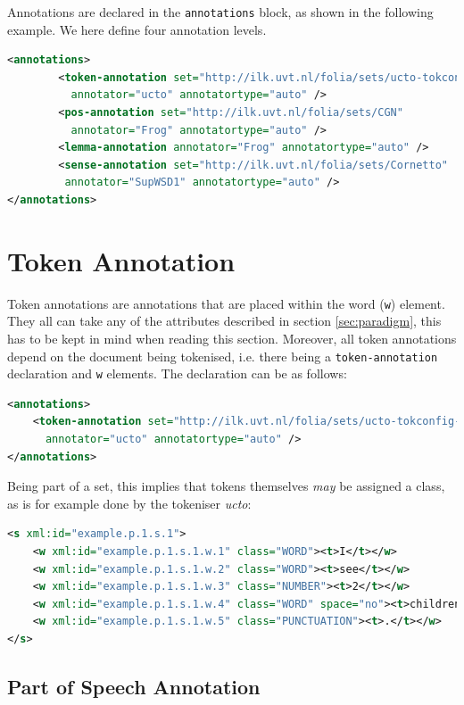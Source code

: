 \documentclass[a4paper,12pt]{report}
\begin{document}
Annotations are declared in the \texttt{annotations} block, as shown in the following example. We here define four annotation levels.

\begin{lstlisting}[language=xml]
<annotations>
        <token-annotation set="http://ilk.uvt.nl/folia/sets/ucto-tokconfig-nl" 
          annotator="ucto" annotatortype="auto" />
        <pos-annotation set="http://ilk.uvt.nl/folia/sets/CGN" 
          annotator="Frog" annotatortype="auto" />
        <lemma-annotation annotator="Frog" annotatortype="auto" />    
        <sense-annotation set="http://ilk.uvt.nl/folia/sets/Cornetto"
         annotator="SupWSD1" annotatortype="auto" />    
</annotations>
\end{lstlisting}


\section{Token Annotation}

Token annotations are annotations that are placed within the word (\texttt{w}) element. They all can take any of the attributes described in section \ref{sec:paradigm}, this has to be kept in mind when reading this section. Moreover, all token annotations depend on the document being tokenised, i.e. there being a \texttt{token-annotation} declaration and \texttt{w} elements. The declaration can be as follows:

\begin{lstlisting}[language=xml]
<annotations>
    <token-annotation set="http://ilk.uvt.nl/folia/sets/ucto-tokconfig-nl"
      annotator="ucto" annotatortype="auto" />
</annotations>
\end{lstlisting}

Being part of a set, this implies that tokens themselves \emph{may} be assigned a class, as is for example done by the tokeniser \emph{ucto}:

\begin{lstlisting}[language=xml]
<s xml:id="example.p.1.s.1">
    <w xml:id="example.p.1.s.1.w.1" class="WORD"><t>I</t></w>
    <w xml:id="example.p.1.s.1.w.2" class="WORD"><t>see</t></w>
    <w xml:id="example.p.1.s.1.w.3" class="NUMBER"><t>2</t></w>
    <w xml:id="example.p.1.s.1.w.4" class="WORD" space="no"><t>children</t></w>
    <w xml:id="example.p.1.s.1.w.5" class="PUNCTUATION"><t>.</t></w>
</s>
\end{lstlisting}        


\subsection{Part of Speech Annotation}
\end{document}
